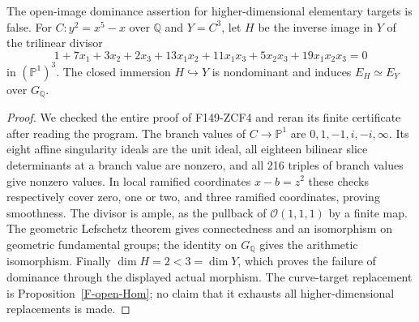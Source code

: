 \begin{proposition}
\label{F-hyperplane}
The open-image dominance assertion for higher-dimensional elementary
targets is false. For $C:y^2=x^5-x$ over $\mathbb Q$ and $Y=C^3$,
let $H$ be the inverse image in $Y$ of the trilinear divisor
\[
 1+7x_1+3x_2+2x_3+13x_1x_2+11x_1x_3
       +5x_2x_3+19x_1x_2x_3=0
\]
in $(\mathbb P^1)^3$. The closed immersion $H\hookrightarrow Y$
is nondominant and induces $E_H\simeq E_Y$ over $G_{\mathbb Q}$.
\end{proposition}
\begin{proof}
We checked the entire proof of F149-ZCF4 and reran its finite
certificate after reading the program. The branch values of
$C\to\mathbb P^1$ are $0,1,-1,i,-i,\infty$. Its eight affine
singularity ideals are the unit ideal, all eighteen bilinear slice
determinants at a branch value are nonzero, and all 216 triples of
branch values give nonzero values. In local ramified coordinates
$x-b=z^2$ these checks respectively cover zero, one or two, and
three ramified coordinates, proving smoothness. The divisor is
ample, as the pullback of $\mathcal O(1,1,1)$ by a finite map.
The geometric Lefschetz theorem gives connectedness and an
isomorphism on geometric fundamental groups; the identity on
$G_{\mathbb Q}$ gives the arithmetic isomorphism. Finally
$\dim H=2<3=\dim Y$, which proves the failure of dominance through
the displayed actual morphism. The curve-target replacement is
Proposition~\ref{F-open-Hom}; no claim that it exhausts all
higher-dimensional replacements is made.
\end{proof}

